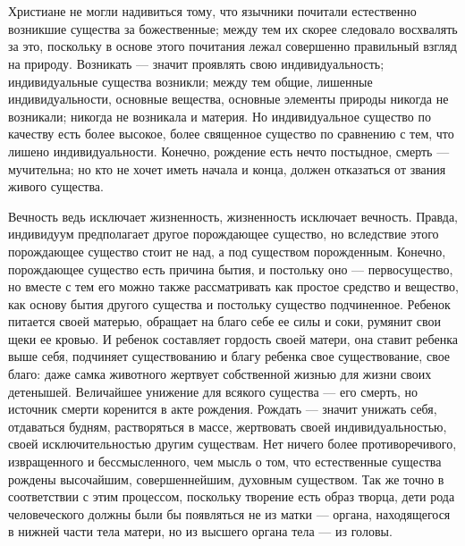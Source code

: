 \documentclass[12pt,oneside]{book}
\begin{document}
\chapter{}

Христиане не могли надивиться тому, что язычники почитали естественно возникшие существа за божественные; между тем их скорее следовало восхвалять за это, поскольку в основе этого почитания лежал совершенно правильный взгляд на природу. Возникать --- значит проявлять свою индивидуальность; индивидуальные существа возникли; между тем общие, лишенные индивидуальности, основные вещества, основные элементы природы никогда не возникали; никогда не возникала и материя. Но индивидуальное существо по качеству есть более высокое, более священное существо по сравнению с тем, что лишено индивидуальности. Конечно, рождение есть нечто постыдное, смерть --- мучительна; но кто не хочет иметь начала и конца, должен отказаться от звания живого существа.

Вечность ведь исключает жизненность, жизненность исключает вечность. Правда,
индивидуум предполагает  другое  порождающее существо, но  вследствие  этого
порождающее  существо стоит  не над, а под  существом  порожденным. Конечно,
порождающее существо есть причина бытия, и постольку оно --- первосущество, но
вместе с тем его можно также рассматривать как простое  средство и вещество,
как основу бытия другого существа и  постольку существо подчиненное. Ребенок
питается своей матерью, обращает на благо  себе ее силы и соки, румянит свои
щеки  ее  кровью.  И  ребенок  составляет гордость своей  матери, она ставит
ребенка   выше  себя,   подчиняет   существованию   и  благу   ребенка  свое
существование, свое  благо: даже самка животного жертвует собственной жизнью
для жизни  своих  детенышей. Величайшее  унижение для всякого существа --- его
смерть, но источник  смерти  коренится  в акте  рождения. Рождать  ---  значит
унижать себя,  отдаваться будням,  растворяться  в  массе, жертвовать  своей
индивидуальностью,  своей исключительностью  другим  существам.  Нет  ничего
более противоречивого,  извращенного и бессмысленного,  чем мысль о том, что
естественные   существа   рождены   высочайшим,   совершеннейшим,   духовным
существом. Так же точно  в соответствии с этим процессом, поскольку творение
есть образ творца, дети рода человеческого должны были бы  появляться не  из
матки  --- органа, находящегося  в нижней  части тела  матери,  но  из высшего
органа тела --- из головы.
\chapter{}
\end{document}
